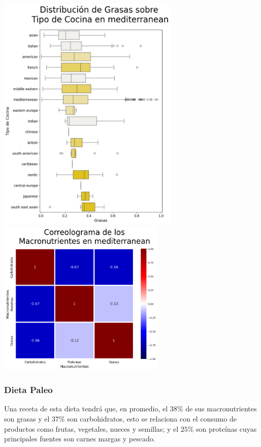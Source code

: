 \documentclass[12pt,a4paper]{article}
\begin{document}
            \begin{center}
                \includegraphics[width=0.65\textwidth]{Resources/2_03_plot_03_3.png}
                \includegraphics[width=0.6\textwidth]{Resources/2_03_plot_03_4.png}
            \end{center}

        \subsubsection{Dieta Paleo}

            Una receta de esta dieta tendrá que, en promedio, el $38\%$ de sus 
            macronutrientes son grasas y el $37\%$ son carbohidratos, esto se 
            relaciona con el consumo de productos como frutas, vegetales, nueces 
            y semillas; y el $25\%$ son proteínas cuyas principales fuentes son 
            carnes margas y pescado.\\
\end{document}
